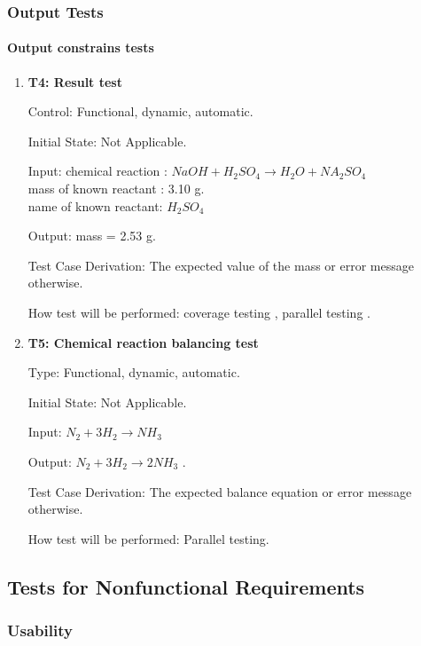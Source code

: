 \documentclass[12pt, titlepage]{article}
\begin{document}
\subsubsection{Output Tests}

\paragraph{Output constrains tests}

\begin{enumerate}

\item{\bf T4: Result test\\}

Control:  Functional, dynamic, automatic.
					
Initial State: Not Applicable.
					
Input: chemical reaction : $NaOH + H_2SO_4 \rightarrow H_2O + NA_2SO_4$\\
mass of known reactant : 3.10 g.\\
name  of known reactant: $H_2SO_4$
				
Output: mass = 2.53 g.

Test Case Derivation: The expected value of the mass  or error message otherwise.
					
How test will be performed: coverage testing , parallel testing .

\item{\bf T5: Chemical reaction balancing test\\}

Type: Functional, dynamic, automatic.
					
Initial State: Not Applicable.
					
Input: $ N_2 + 3H_2 \rightarrow NH_3 $ 
					
Output: $ N_2 + 3H_2 \rightarrow 2NH_3 $ .

Test Case Derivation: The expected balance equation or error message otherwise.

How test will be performed: Parallel testing.

\end{enumerate}

\subsection{Tests for Nonfunctional Requirements}


\subsubsection{Usability}
		
\end{document}
